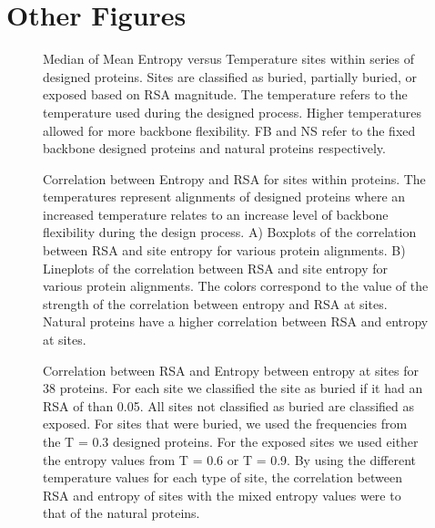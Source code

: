 \documentclass[12pt]{article}
\makeatletter
\newcommand{\customlabel}[2]{%
\protected@write \@auxout {}{\string \newlabel {#1}{{#2}{}}}}
\makeatother
\begin{document}
\customlabel{NoahAADisFig1}{S2}


\cleardoublepage

\section{Other Figures}


\begin{figure}[H]
\caption{Median of Mean Entropy versus Temperature sites within series of designed proteins.  Sites are classified as buried, partially buried, or exposed based on RSA magnitude. The temperature refers to the temperature used during the designed process. Higher temperatures allowed for more backbone flexibility. FB and NS refer to the fixed backbone designed proteins and natural proteins respectively.}
\label{Duncan_Position_Entropy}
\end{figure}
 


\begin{figure}[H]
\centering
\caption{Correlation between Entropy and RSA for sites within proteins.  The temperatures represent alignments of designed proteins where an increased temperature relates to an increase level of backbone flexibility during the design process. A) Boxplots of the correlation between RSA and site entropy for various protein alignments. B) Lineplots of the correlation between RSA and site entropy for various protein alignments. The colors correspond to the value of the strength of the correlation between entropy and RSA at sites. Natural proteins have a higher correlation between RSA and entropy at sites.}
\label{StructureFig1}
\end{figure}

\begin{figure}[H]
\caption{Correlation between RSA and Entropy between entropy at sites for 38 proteins. For each site we classified the site as buried if it had an RSA of than 0.05. All sites not classified as buried are classified as exposed. For sites that were buried, we used the frequencies from the T = 0.3 designed proteins. For the exposed sites we used either the entropy values from T = 0.6 or T = 0.9. By using the different temperature values for each type of site, the correlation between RSA and entropy of sites with the mixed entropy values were to that of the natural proteins.}
\label{Mixed_RSA_Entropy_Duncan}
\end{figure}
\end{document}
